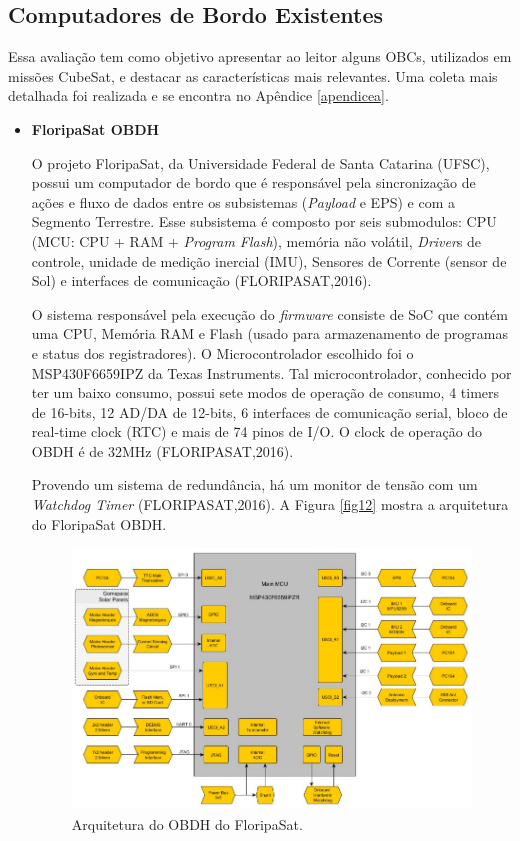 \subsection{Computadores de Bordo Existentes}

Essa avaliação tem como objetivo apresentar ao leitor alguns OBCs, utilizados em missões CubeSat, e destacar as características mais relevantes. Uma coleta mais detalhada foi realizada e se encontra no Apêndice \ref{apendicea}.

\begin{itemize}

\item \textbf{FloripaSat OBDH}

	O projeto FloripaSat, da Universidade Federal de Santa Catarina (UFSC), possui um  computador de bordo que é responsável pela sincronização de ações e fluxo de dados entre os subsistemas (\textit{Payload} e EPS) e com a Segmento Terrestre. Esse subsistema é composto por seis submodulos: CPU (MCU: CPU + RAM + \textit{Program Flash}), memória não volátil, \textit{Driver}s de controle, unidade de medição inercial (IMU), Sensores de Corrente (sensor de Sol) e interfaces de comunicação (FLORIPASAT,2016).

	O sistema responsável pela execução do \textit{firmware} consiste de SoC que contém uma CPU, Memória RAM e Flash (usado para armazenamento de programas e status dos registradores). O Microcontrolador escolhido foi o MSP430F6659IPZ da Texas Instruments. Tal microcontrolador, conhecido por ter um baixo consumo, possui sete modos de operação de consumo, 4 timers de 16-bits, 12 AD/DA de 12-bits, 6 interfaces de comunicação serial, bloco de real-time clock (RTC) e mais de 74 pinos de I/O. O clock de operação do OBDH é de 32MHz (FLORIPASAT,2016).

	Provendo um sistema de redundância, há um monitor de tensão com um \textit{Watchdog Timer} (FLORIPASAT,2016). A Figura \ref{fig12} mostra a arquitetura do FloripaSat OBDH.

\begin{figure}[h]
	\centering
	
	\caption{Arquitetura do OBDH do FloripaSat.}
	
	\includegraphics[keepaspectratio=true,scale=0.5]{figuras/floripasatobdh.PNG}
	

\end{figure}
\end{itemize}

